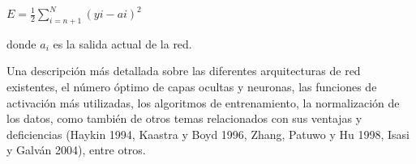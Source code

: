 \vspace*{0.2 cm}

\begin{center}
$\displaystyle{E = \frac{1}{2} \sum_{i=n+1}^{N}(y{i}-a{i})^2 }$
\end{center}

\vspace*{0.2 cm}


\noindent  donde $a_{i}$ es la salida actual de la red.

\hspace*{0.4 cm}Una descripci\'on m\'as detallada sobre las diferentes arquitecturas de red existentes, el n\'umero \'optimo de capas ocultas y neuronas, las funciones de activaci\'on m\'as utilizadas, los algoritmos de entrenamiento, la normalizaci\'on de los datos, como tambi\'en de otros temas relacionados con sus ventajas y deficiencias (Haykin 1994, Kaastra y Boyd 1996, Zhang, Patuwo y Hu 1998, Isasi y Galv\'an 2004), entre otros.



% 
% 


